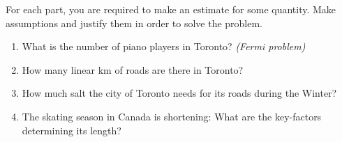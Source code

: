 \begin{exercises}
	\begin{problist}
	\prob
	For each part, you are required to make an estimate for some quantity. Make assumptions and justify them in order to solve the problem.
		\begin{enumerate}
			\item What is the number of piano players in Toronto? \hfill \emph{(Fermi problem)}
			\item How many linear km of roads are there in Toronto?
			\item How much salt the city of Toronto needs for its roads during the Winter?
			\item The skating season in Canada is shortening: What are the key-factors determining its length?
		\end{enumerate}
	\end{problist}
\end{exercises}
